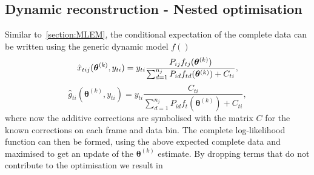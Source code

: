 \subsection{Dynamic reconstruction - Nested optimisation}
Similar to~\ref{section:MLEM}, the conditional expectation of the complete data can be written using the generic dynamic model $f()$  
\begin{equation}
\label{eq:Dynamic_complete_Data_Expectation}
\hat{x}_{tij}(\bm{\theta}^{(k)},y_{ti}) = y_{ti}
\frac{P_{ij} f_{tj}(\bm\theta^{(k)})}
{\sum_{d=1}^{n_j} P_{id} f_{td}(\bm\theta^{(k)}) + C_{ti}}\\,
\end{equation}
%
\begin{equation}
\label{eq:Dynamic_complete_Data_Expectation2}
\hat{g}_{ti}(\bm{\theta}^{(k)},y_{ti}) = y_{ti}
\frac{C_{ti}}{\sum_{d=1}^{n_j} P_{id} f_t(\bm\theta^{(k)}) + C_{ti}} ,
\end{equation}
%
where now the additive corrections are symbolised with the matrix $C$ for the known corrections on each frame and data bin.
The complete log-likelihood function can then be formed, using the above expected complete data and maximised to get an update of the $\bm\theta^{(k)}$ estimate. By dropping terms that do not contribute to the optimisation we result in
